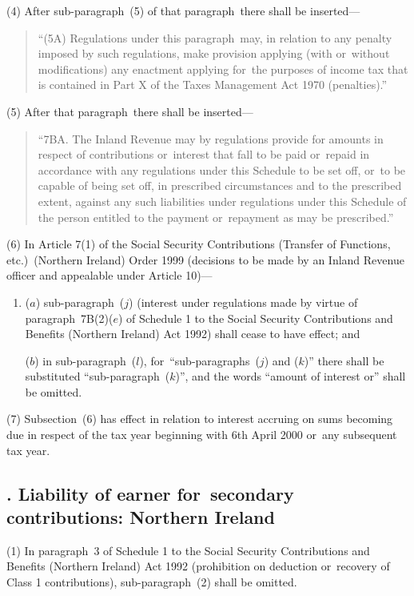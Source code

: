 \documentclass[12pt,a4paper]{article}
\begin{document}
(4) After sub-paragraph~(5)  of that paragraph~there shall be inserted—
\begin{quotation}
“(5A) Regulations under this paragraph~may, in relation to any penalty imposed by such regulations, make provision applying (with or~without modifications) any enactment applying for~the purposes of income tax that is contained in Part X of the Taxes Management Act 1970 (penalties).”
\end{quotation}

(5) After that paragraph~there shall be inserted—
\begin{quotation}
“7BA. The Inland Revenue may by regulations provide for amounts in respect of contributions or~interest that fall to be paid or~repaid in accordance with any regulations under this Schedule to be set off, or~to be capable of being set off, in prescribed circumstances and to the prescribed extent, against any such liabilities under regulations under this Schedule of the person entitled to the payment or~repayment as may be prescribed.”
\end{quotation}

(6) In Article 7(1)  of the Social Security Contributions (Transfer of Functions, etc.)\ (Northern Ireland) Order 1999 (decisions to be made by an Inland Revenue officer and appealable under Article 10)—
\begin{enumerate}\item[]
($a$) sub-paragraph~($j$)  (interest under regulations made by virtue of paragraph~7B(2)($e$)  of Schedule 1 to the Social Security Contributions and Benefits (Northern Ireland) Act 1992) shall cease to have effect; and

($b$) in sub-paragraph~($l$), for~“sub-paragraphs~($j$)  and ($k$)” there shall be substituted “sub-paragraph~($k$)”, and the words “amount of interest or” shall be omitted.
\end{enumerate}

(7) Subsection~(6)  has effect in relation to interest accruing on sums becoming due in respect of the tax year beginning with 6th April 2000 or~any subsequent tax year.

\subsection[81. Liability of earner for~secondary contributions: Northern Ireland]{. Liability of earner for~secondary contributions: Northern Ireland}

(1) In paragraph~3 of Schedule 1 to the Social Security Contributions and Benefits (Northern Ireland) Act 1992 (prohibition on deduction or~recovery of Class 1 contributions), sub-paragraph~(2)  shall be omitted.
\end{document}
